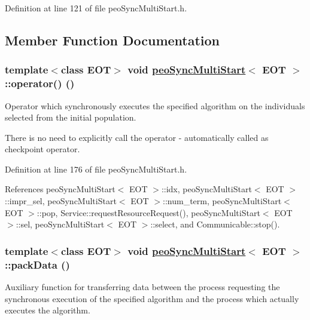 Definition at line 121 of file peo\-Sync\-Multi\-Start.h.

\subsection{Member Function Documentation}
\hypertarget{classpeoSyncMultiStart_76385b33fe514f91cb83f0fbecbeb3c2}{
\subsubsection[operator()]{\setlength{\rightskip}{0pt plus 5cm}template$<$class EOT$>$ void \hyperlink{classpeoSyncMultiStart}{peo\-Sync\-Multi\-Start}$<$ EOT $>$::operator() ()}}
\label{classpeoSyncMultiStart_76385b33fe514f91cb83f0fbecbeb3c2}


Operator which synchronously executes the specified algorithm on the individuals selected from the initial population. 

There is no need to explicitly call the operator - automatically called as checkpoint operator. 

Definition at line 176 of file peo\-Sync\-Multi\-Start.h.

References peo\-Sync\-Multi\-Start$<$ EOT $>$::idx, peo\-Sync\-Multi\-Start$<$ EOT $>$::impr\_\-sel, peo\-Sync\-Multi\-Start$<$ EOT $>$::num\_\-term, peo\-Sync\-Multi\-Start$<$ EOT $>$::pop, Service::request\-Resource\-Request(), peo\-Sync\-Multi\-Start$<$ EOT $>$::sel, peo\-Sync\-Multi\-Start$<$ EOT $>$::select, and Communicable::stop().\hypertarget{classpeoSyncMultiStart_8becfab1922b64708dca5a53e2932a5a}{
\subsubsection[packData]{\setlength{\rightskip}{0pt plus 5cm}template$<$class EOT$>$ void \hyperlink{classpeoSyncMultiStart}{peo\-Sync\-Multi\-Start}$<$ EOT $>$::pack\-Data ()}}
\label{classpeoSyncMultiStart_8becfab1922b64708dca5a53e2932a5a}


Auxiliary function for transferring data between the process requesting the synchronous execution of the specified algorithm and the process which actually executes the algorithm. 

